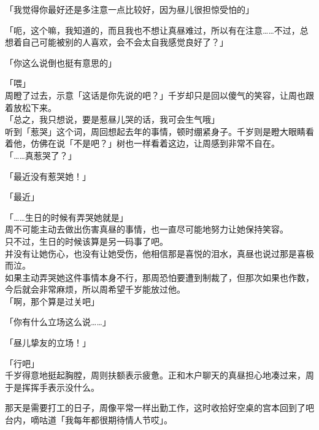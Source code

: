 「我觉得你最好还是多注意一点比较好，因为昼儿很担惊受怕的」

「呃，这个嘛，我知道的，而且我也不想让真昼难过，所以有在注意……不过，总想着自己可能被别的人喜欢，会不会太自我感觉良好了？」

「你这么说倒也挺有意思的」

「喂」\\

周瞪了过去，示意「这话是你先说的吧？」千岁却只是回以傻气的笑容，让周也跟着放松下来。\\

「总之，我只想说，要是惹昼儿哭的话，我可会生气哦」\\

听到「惹哭」这个词，周回想起去年的事情，顿时绷紧身子。千岁则是瞪大眼睛看着他，仿佛在说「不是吧？」树也一样看着这边，让周感到非常不自在。\\

「……真惹哭了？」

「最近没有惹哭她！」

「最近」

「……生日的时候有弄哭她就是」\\

周不可能主动去做出伤害真昼的事情，也一直尽可能地努力让她保持笑容。\\

只不过，生日的时候该算是另一码事了吧。\\

并没有让她伤心，也没有让她受伤，他相信那是喜悦的泪水，真昼也说过那是喜极而泣。\\

如果主动弄哭她这件事情本身不行，那周恐怕要遭到制裁了，但那次如果也作数，今后就会非常麻烦，所以周希望千岁能放过他。\\

「啊，那个算是过关吧」

「你有什么立场这么说……」

「昼儿挚友的立场！」

「行吧」\\

千岁得意地挺起胸膛，周则扶额表示疲惫。正和木户聊天的真昼担心地凑过来，周于是挥挥手表示没什么。\\

\vspace{2\baselineskip}

那天是需要打工的日子，周像平常一样出勤工作，这时收拾好空桌的宫本回到了吧台内，嘀咕道「我每年都很期待情人节哎」。\\

